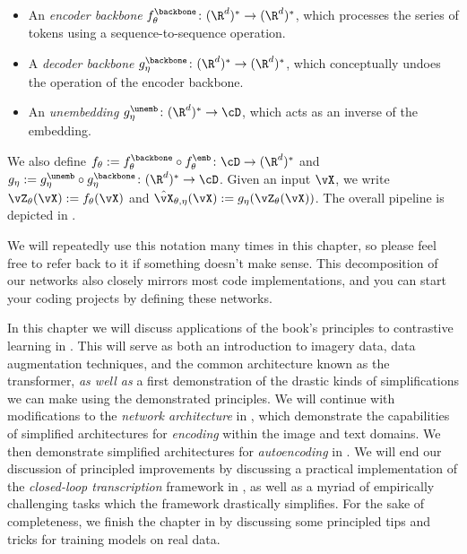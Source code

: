 \documentclass[../../book-main.tex]{subfiles}
\begin{document}
\begin{itemize}
\begin{itemize}
        \item An \textit{encoder backbone} \(f_{\theta}^{\backbone} \colon (\R^{d})^{*} \to (\R^{d})^{*}\), which processes the series of tokens using a sequence-to-sequence operation.
        \item A \textit{decoder backbone} \(g_{\eta}^{\backbone} \colon (\R^{d})^{*} \to (\R^{d})^{*}\), which conceptually undoes the operation of the encoder backbone.
        \item An \textit{unembedding} \(g_{\eta}^{\unemb} \colon (\R^{d})^{*} \to \cD\), which acts as an inverse of the embedding.
    \end{itemize}
    We also define \(f_{\theta} := f_{\theta}^{\backbone} \circ f_{\theta}^{\emb} \colon \cD \to (\R^{d})^{*}\) and \(g_{\eta} := g_{\eta}^{\unemb} \circ g_{\eta}^{\backbone} \colon (\R^{d})^{*} \to \cD\). Given an input \(\vX\), we write \(\vZ_{\theta}(\vX) := f_{\theta}(\vX)\) and \(\hat{\vX}_{\theta, \eta}(\vX) := g_{\eta}(\vZ_{\theta}(\vX))\). The overall pipeline is depicted in .
\end{itemize}

We will repeatedly use this notation many times in this chapter, so please feel free to refer back to it if something doesn't make sense. This decomposition of our networks also closely mirrors most code implementations, and you can start your coding projects by defining these networks.

In this chapter we will discuss applications of the book's principles to contrastive learning in . This will serve as both an introduction to imagery data, data augmentation techniques, and the common architecture known as the transformer, \textit{as well as} a first demonstration of the drastic kinds of simplifications we can make using the demonstrated principles. We will continue with modifications to the \textit{network architecture} in , which demonstrate the capabilities of simplified architectures for \textit{encoding} within the image and text domains. We then demonstrate simplified architectures for \textit{autoencoding} in . We will end our discussion of principled improvements by discussing a practical implementation of the \textit{closed-loop transcription} framework in , as well as a myriad of empirically challenging tasks which the framework drastically simplifies. For the sake of completeness, we finish the chapter in  by discussing some principled tips and tricks for training models on real data.
\end{document}
